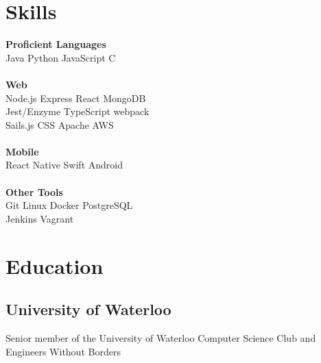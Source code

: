 \documentclass[]{anand-resume}
\begin{document}
%
%



%
%


\begin{minipage}[t]{0.30\textwidth} 


\section{Skills}
\textbf{Proficient Languages}\\
Java \textbullet{}   Python \textbullet{} JavaScript \textbullet{} C \\ \\
\textbf{Web}\\
Node.js \textbullet{} Express \textbullet{} React \textbullet{} MongoDB  \\
Jest/Enzyme \textbullet{} TypeScript \textbullet{} webpack \\  Sails.js \textbullet{} CSS \textbullet{} Apache \textbullet{} AWS  \\ \\
\textbf{Mobile} \\
React Native \textbullet{} Swift \textbullet{} Android \\ \\
\textbf{ Other Tools}\\
Git \textbullet{} Linux \textbullet{} Docker \textbullet{} PostgreSQL \\
Jenkins \textbullet{} Vagrant \\
\sectionsep


\section{Education} 

\subsection{University of Waterloo}
\sectionsep
Senior member of the University of Waterloo Computer Science Club and Engineers Without Borders \\


\end{minipage}
\end{document}
